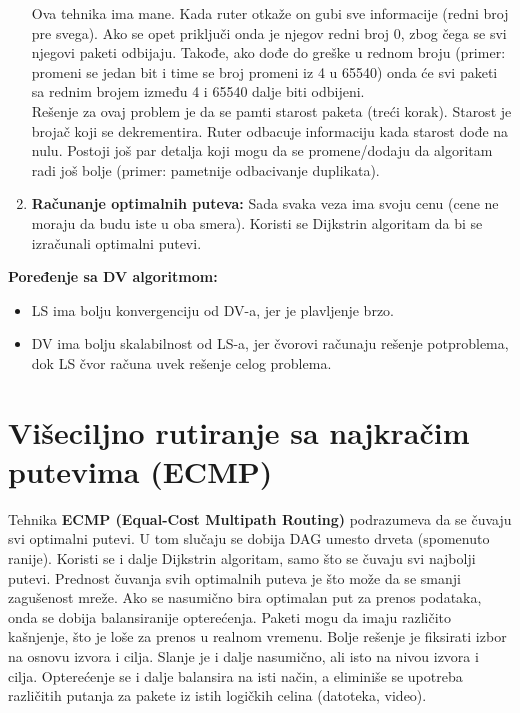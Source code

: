 \documentclass[a4paper]{article}
\begin{document}
\begin{enumerate}
              \indent Ova tehnika ima mane. Kada ruter otkaže on gubi sve informacije (redni broj pre
              svega). Ako se opet priključi onda je njegov redni broj 0, zbog čega se svi njegovi
              paketi odbijaju. Takođe, ako dođe do greške u rednom broju (primer: promeni se 
              jedan bit i time se broj promeni iz 4 u 65540) onda će svi paketi sa rednim brojem 
              između 4 i 65540 dalje biti odbijeni. \\
              \indent Rešenje za ovaj problem je da se pamti starost paketa (treći korak).
              Starost je brojač koji se dekrementira. Ruter odbacuje informaciju kada starost
              dođe na nulu. Postoji još par detalja koji mogu da se promene/dodaju da 
              algoritam radi još bolje (primer: pametnije odbacivanje duplikata).
        \item \textbf{Računanje optimalnih puteva:} Sada svaka veza ima svoju cenu (cene ne 
              moraju da budu iste u oba smera). Koristi se Dijkstrin algoritam da bi 
              se izračunali optimalni putevi. 
    \end{enumerate}

    \textbf{Poređenje sa DV algoritmom:} 
    \begin{itemize}
        \item LS ima bolju konvergenciju od DV-a, jer je plavljenje brzo.
        \item DV ima bolju skalabilnost od LS-a, jer čvorovi računaju rešenje potproblema,
              dok LS čvor računa uvek rešenje celog problema.
    \end{itemize}
    
\section{Višeciljno rutiranje sa najkračim putevima (ECMP)}
    Tehnika \textbf{ECMP (Equal-Cost Multipath Routing)} podrazumeva da se čuvaju svi optimalni putevi.
    U tom slučaju se dobija DAG umesto drveta (spomenuto ranije).
    Koristi se i dalje Dijkstrin algoritam, samo što se čuvaju svi najbolji putevi. 
    Prednost čuvanja svih optimalnih puteva je što može da se smanji zagušenost mreže. Ako
    se nasumično bira optimalan put za prenos podataka, onda se dobija balansiranije opterećenja.
    Paketi mogu da imaju različito kašnjenje, što je loše za prenos u realnom vremenu. Bolje
    rešenje je fiksirati izbor na osnovu izvora i cilja. Slanje je i dalje nasumično, ali
    isto na nivou izvora i cilja. Opterećenje se i dalje balansira na isti način, a eliminiše
    se upotreba različitih putanja za pakete iz istih logičkih celina (datoteka, video).
\end{document}
